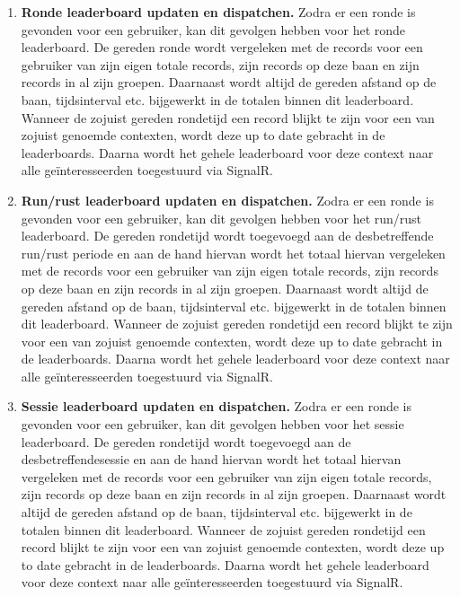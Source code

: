 \begin{enumerate}
\item \textbf{Ronde leaderboard updaten en dispatchen.}
Zodra er een ronde is gevonden voor een gebruiker, kan dit gevolgen hebben voor het ronde leaderboard. De gereden ronde wordt vergeleken met de records voor een gebruiker van zijn eigen totale records, zijn records op deze baan en zijn records in al zijn groepen. Daarnaast wordt altijd de gereden afstand op de baan, tijdsinterval etc. bijgewerkt in de totalen binnen dit leaderboard. Wanneer de zojuist gereden rondetijd een record blijkt te zijn voor een van zojuist genoemde contexten, wordt deze up to date gebracht in de leaderboards. Daarna wordt het gehele leaderboard voor deze context naar alle geïnteresseerden toegestuurd via SignalR.

\item \textbf{Run/rust leaderboard updaten en dispatchen.}
Zodra er een ronde is gevonden voor een gebruiker, kan dit gevolgen hebben voor het run/rust leaderboard. De gereden rondetijd wordt toegevoegd aan de desbetreffende run/rust periode en aan de hand hiervan wordt het totaal hiervan vergeleken met de records voor een gebruiker van zijn eigen totale records, zijn records op deze baan en zijn records in al zijn groepen. Daarnaast wordt altijd de gereden afstand op de baan, tijdsinterval etc. bijgewerkt in de totalen binnen dit leaderboard. Wanneer de zojuist gereden rondetijd een record blijkt te zijn voor een van zojuist genoemde contexten, wordt deze up to date gebracht in de leaderboards. Daarna wordt het gehele leaderboard voor deze context naar alle geïnteresseerden toegestuurd via SignalR.

\item \textbf{Sessie leaderboard updaten en dispatchen.}
Zodra er een ronde is gevonden voor een gebruiker, kan dit gevolgen hebben voor het sessie leaderboard. De gereden rondetijd wordt toegevoegd aan de desbetreffendesessie en aan de hand hiervan wordt het totaal hiervan vergeleken met de records voor een gebruiker van zijn eigen totale records, zijn records op deze baan en zijn records in al zijn groepen. Daarnaast wordt altijd de gereden afstand op de baan, tijdsinterval etc. bijgewerkt in de totalen binnen dit leaderboard. Wanneer de zojuist gereden rondetijd een record blijkt te zijn voor een van zojuist genoemde contexten, wordt deze up to date gebracht in de leaderboards. Daarna wordt het gehele leaderboard voor deze context naar alle geïnteresseerden toegestuurd via SignalR.

\end{enumerate}

